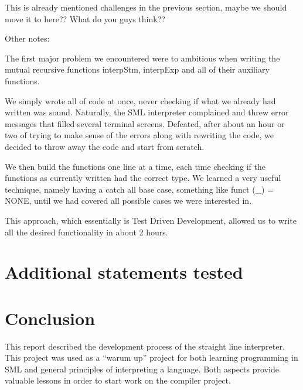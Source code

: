 \documentclass[a4paper]{article}
\begin{document}
This is already mentioned challenges in the previous section, maybe we should move it to here?? What do you guys think??

Other notes:

The first major problem we encountered were to ambitious when writing the mutual recursive functions interpStm, interpExp and all of their auxiliary functions.

We simply wrote all of code at once, never checking if what we already had written was sound. Naturally, the SML interpreter complained and threw error messages that filled several terminal screens. Defeated, after about an hour or two of trying to make sense of the errors along with rewriting the code, we decided to throw away the code and start from scratch.

We then build the functions one line at a time, each time checking if the functions as currently written had the correct type. We learned a very useful technique, namely having a catch all base case, something like funct (\_) = NONE, until we had covered all possible cases we were interested in.

This approach, which essentially is Test Driven Development, allowed us to write all the desired functionality in about 2 hours.

\section{Additional statements tested}

\section{Conclusion}
This report described the development process of the straight line interpreter. This project was used as a ``warum up'' project for both learning programming in SML and general principles of interpreting a language. Both aspects provide valuable lessons in order to start work on the compiler project. 
\end{document}
